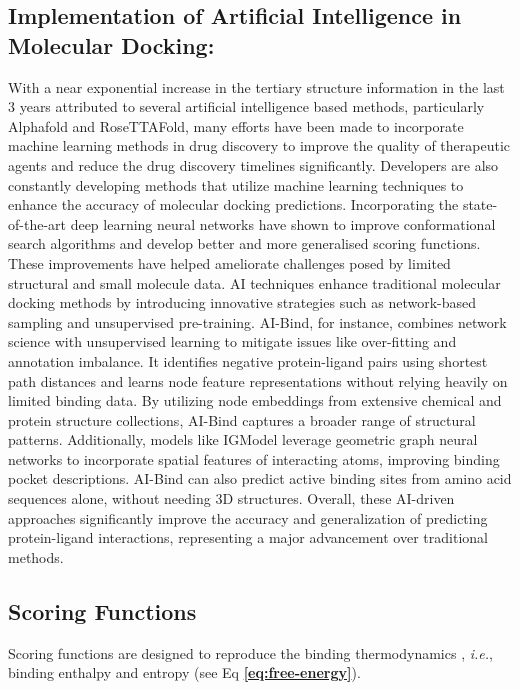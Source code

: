 \documentclass[10pt,letterpaper]{article}
\begin{document}
{{\subsection*{Implementation of Artificial Intelligence in Molecular Docking:}
With a near exponential increase in the tertiary structure information in the last 3 years attributed to several artificial intelligence based methods, particularly Alphafold\cite{bib37} and RoseTTAFold\cite{bib38}, many efforts have been made to incorporate machine learning methods in drug discovery to improve the quality of therapeutic agents and reduce the drug discovery timelines significantly\cite{bib36}. Developers are also constantly developing methods that utilize machine learning techniques to enhance the accuracy of molecular docking predictions. Incorporating the state-of-the-art deep learning neural networks have shown to improve conformational search algorithms and develop better and more generalised scoring functions. These improvements have helped ameliorate challenges posed by limited structural and small molecule data\cite{bib39, bib40}. AI techniques enhance traditional molecular docking methods by introducing innovative strategies such as network-based sampling\cite{bib71} and unsupervised pre-training\cite{bib72, bib73}. AI-Bind\cite{bib74}, for instance, combines network science with unsupervised learning to mitigate issues like over-fitting and annotation imbalance. It identifies negative protein-ligand pairs using shortest path distances and learns node feature representations without relying heavily on limited binding data. By utilizing node embeddings from extensive chemical and protein structure collections, AI-Bind captures a broader range of structural patterns. Additionally, models like IGModel\cite{bib75} leverage geometric graph neural networks to incorporate spatial features of interacting atoms, improving binding pocket descriptions. AI-Bind can also predict active binding sites from amino acid sequences alone, without needing 3D structures. Overall, these AI-driven approaches significantly improve the accuracy and generalization of predicting protein-ligand interactions, representing a major advancement over traditional methods.

\subsection*{Scoring Functions}
Scoring functions are designed to reproduce the binding thermodynamics \cite{bib2, bib3}, \textit{i.e.}, binding enthalpy and entropy (see Eq \textbf{\ref{eq:free-energy}}).

}}
\end{document}
